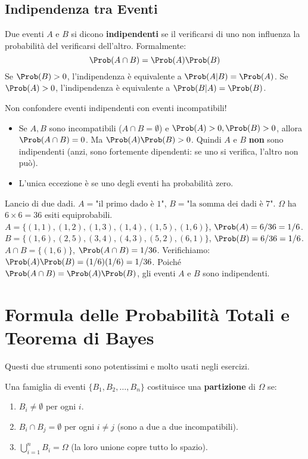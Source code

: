 \subsection{Indipendenza tra Eventi}
\begin{definition}
Due eventi $A$ e $B$ si dicono \textbf{indipendenti} se il verificarsi di uno non influenza la probabilità del verificarsi dell'altro. Formalmente:
\[ \Prob(A \cap B) = \Prob(A) \Prob(B) \]
Se $\Prob(B)>0$, l'indipendenza è equivalente a $\Prob(A|B) = \Prob(A)$.
Se $\Prob(A)>0$, l'indipendenza è equivalente a $\Prob(B|A) = \Prob(B)$.
\end{definition}

\begin{remark}
Non confondere eventi indipendenti con eventi incompatibili!
\begin{itemize}
    \item Se $A, B$ sono incompatibili ($A \cap B = \emptyset$) e $\Prob(A)>0, \Prob(B)>0$, allora $\Prob(A \cap B) = 0$. Ma $\Prob(A)\Prob(B) > 0$. Quindi $A$ e $B$ \textbf{non} sono indipendenti (anzi, sono fortemente dipendenti: se uno si verifica, l'altro non può).
    \item L'unica eccezione è se uno degli eventi ha probabilità zero.
\end{itemize}
\end{remark}

\begin{example}
Lancio di due dadi. $A = \text{"il primo dado è 1"}$, $B = \text{"la somma dei dadi è 7"}$.
$\Omega$ ha $6 \times 6 = 36$ esiti equiprobabili.
$A = \{(1,1), (1,2), (1,3), (1,4), (1,5), (1,6)\}$, $\Prob(A) = 6/36 = 1/6$.
$B = \{(1,6), (2,5), (3,4), (4,3), (5,2), (6,1)\}$, $\Prob(B) = 6/36 = 1/6$.
$A \cap B = \{(1,6)\}$, $\Prob(A \cap B) = 1/36$.
Verifichiamo: $\Prob(A)\Prob(B) = (1/6)(1/6) = 1/36$.
Poiché $\Prob(A \cap B) = \Prob(A)\Prob(B)$, gli eventi $A$ e $B$ sono indipendenti.
\end{example}

\section{Formula delle Probabilità Totali e Teorema di Bayes}
Questi due strumenti sono potentissimi e molto usati negli esercizi.

\begin{definition}
Una famiglia di eventi $\{B_1, B_2, \dots, B_n\}$ costituisce una \textbf{partizione} di $\Omega$ se:
\begin{enumerate}
    \item $B_i \neq \emptyset$ per ogni $i$.
    \item $B_i \cap B_j = \emptyset$ per ogni $i \neq j$ (sono a due a due incompatibili).
    \item $\bigcup_{i=1}^n B_i = \Omega$ (la loro unione copre tutto lo spazio).
\end{enumerate}
\end{definition}

